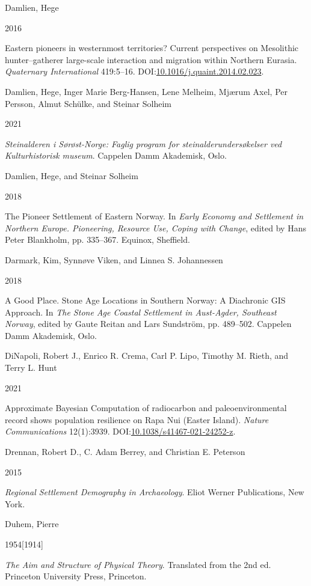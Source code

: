 \documentclass[
  12pt,
  a4paper,
  oneside]{book}
\newlength{\cslhangindent}
\newlength{\csllabelwidth}
\newlength{\cslentryspacingunit} %
\newenvironment{CSLReferences}[2] %
 {%
  \setlength{\parindent}{0pt}
  \ifodd #1
  \let\oldpar\par
  \def\par{\hangindent=\cslhangindent\oldpar}
  \fi
  \setlength{\parskip}{#2\cslentryspacingunit}
 }%
 {}
\newcommand{\CSLBlock}[1]{#1\hfill\break}
\newcommand{\CSLLeftMargin}[1]{\parbox[t]{\csllabelwidth}{#1}}
\newcommand{\CSLRightInline}[1]{\parbox[t]{\linewidth - \csllabelwidth}{#1}\break}
\begin{document}
\begin{CSLReferences}{0}{0}
\leavevmode{}%
\CSLBlock{Damlien, Hege}
\CSLLeftMargin{ 2016}
\CSLRightInline{{Eastern pioneers in westernmost territories? Current perspectives on Mesolithic hunter--gatherer large-scale interaction and migration within Northern Eurasia}. \emph{Quaternary International} 419:5--16. DOI:\href{https://doi.org/10.1016/j.quaint.2014.02.023}{10.1016/j.quaint.2014.02.023}.}

\leavevmode{}%
\CSLBlock{Damlien, Hege, Inger Marie Berg-Hansen, Lene Melheim, Mjærum Axel, Per Persson, Almut Schülke, and Steinar Solheim}
\CSLLeftMargin{ 2021}
\CSLRightInline{\emph{{Steinalderen i Sørøst-Norge: Faglig program for steinalderundersøkelser ved Kulturhistorisk museum}}. Cappelen Damm Akademisk, Oslo.}

\leavevmode{}%
\CSLBlock{Damlien, Hege, and Steinar Solheim}
\CSLLeftMargin{ 2018}
\CSLRightInline{{The Pioneer Settlement of Eastern Norway}. In \emph{{Early Economy and Settlement in Northern Europe. Pioneering, Resource Use, Coping with Change}}, edited by Hans Peter Blankholm, pp. 335--367. Equinox, Sheffield.}

\leavevmode{}%
\CSLBlock{Darmark, Kim, Synnøve Viken, and Linnea S. Johannessen}
\CSLLeftMargin{ 2018}
\CSLRightInline{{A Good Place. Stone Age Locations in Southern Norway: A Diachronic GIS Approach}. In \emph{{The Stone Age Coastal Settlement in Aust-Agder, Southeast Norway}}, edited by Gaute Reitan and Lars Sundström, pp. 489--502. Cappelen Damm Akademisk, Oslo.}

\leavevmode{}%
\CSLBlock{DiNapoli, Robert J., Enrico R. Crema, Carl P. Lipo, Timothy M. Rieth, and Terry L. Hunt}
\CSLLeftMargin{ 2021}
\CSLRightInline{{Approximate Bayesian Computation of radiocarbon and paleoenvironmental record shows population resilience on Rapa Nui (Easter Island)}. \emph{Nature Communications} 12(1):3939. DOI:\href{https://doi.org/10.1038/s41467-021-24252-z}{10.1038/s41467-021-24252-z}.}

\leavevmode{}%
\CSLBlock{Drennan, Robert D., C. Adam Berrey, and Christian E. Peterson}
\CSLLeftMargin{ 2015}
\CSLRightInline{\emph{{Regional Settlement Demography in Archaeology}}. Eliot Werner Publications, New York.}

\leavevmode{}%
\CSLBlock{Duhem, Pierre}
\CSLLeftMargin{ 1954{[}1914{]}}
\CSLRightInline{\emph{{The Aim and Structure of Physical Theory}}. Translated from the 2nd ed. Princeton University Press, Princeton.}


\end{CSLReferences}
\end{document}
